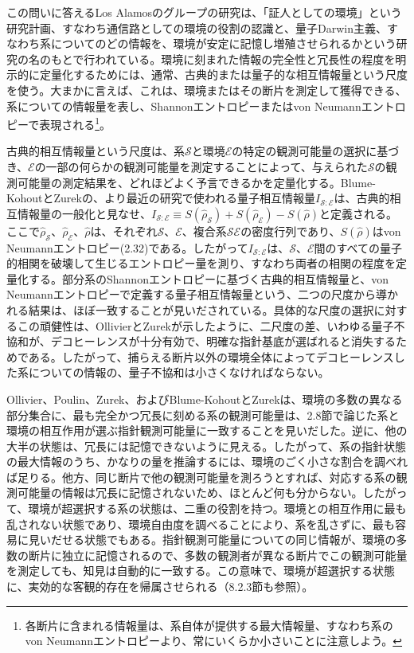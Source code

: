 この問いに答えるLos Alamosのグループの研究は、「証人としての環境」という研究計画、すなわち通信路としての環境の役割の認識と、量子Darwin主義、すなわち系についてのどの情報を、環境が安定に記憶し増殖させられるかという研究の名のもとで行われている\cite{ref066,ref110,ref111,ref112,ref113}。環境に刻まれた情報の完全性と冗長性の程度を明示的に定量化するためには、通常、古典的\cite{ref110,ref111}または量子的\cite{ref016,ref112,ref113}な相互情報量という尺度を使う。大まかに言えば、これは、環境またはその断片を測定して獲得できる、系についての情報量を表し、Shannonエントロピー\cite{ref114,ref115,ref116}またはvon Neumannエントロピーで表現される\footnote{各断片に含まれる情報量は、系自体が提供する最大情報量、すなわち系のvon Neumannエントロピーより、常にいくらか小さいことに注意しよう\cite{ref113}。}。

\hypertarget{srcpage:87}{}\label{srcpage:87}
古典的相互情報量という尺度は、系$\mathcal S$と環境$\mathcal E$の特定の観測可能量の選択に基づき、$\mathcal E$の一部の何らかの観測可能量を測定することによって、与えられた$\mathcal S$の観測可能量の測定結果を、どれほどよく予言できるかを定量化する\cite{ref110,ref111}。Blume-KohoutとZurekの、より最近の研究\cite{ref112,ref113}で使われる量子相互情報量$I_{\mathcal S:\mathcal E}$は、古典的相互情報量の一般化と見なせ、$I_{\mathcal S:\mathcal E}\equiv S(\hat\rho_{\mathcal S})+S(\hat\rho_{\mathcal E})-S(\hat\rho)$と定義される。ここで$\hat\rho_{\mathcal S}$、$\hat\rho_{\mathcal E}$、$\hat\rho$は、それぞれ$\mathcal S$、$\mathcal E$、複合系$\mathcal{SE}$の密度行列であり、$S(\hat\rho)$はvon Neumannエントロピー(2.32)である。したがって$I_{\mathcal S:\mathcal E}$は、$\mathcal S$、$\mathcal E$間のすべての量子的相関を破壊して生じるエントロピー量を測り、すなわち両者の相関の程度を定量化する。部分系のShannonエントロピーに基づく古典的相互情報量と、von Neumannエントロピーで定義する量子相互情報量という、二つの尺度から導かれる結果は、ほぼ一致することが見いだされている\cite{ref016,ref110,ref111,ref112,ref113}。具体的な尺度の選択に対するこの頑健性は、OllivierとZurek\cite{ref117}が示したように、二尺度の差、いわゆる量子不協和\cite{ref117}が、デコヒーレンスが十分有効で、明確な指針基底が選ばれると消失するためである。したがって、捕らえる断片以外の環境全体によってデコヒーレンスした系についての情報の、量子不協和は小さくなければならない。

Ollivier、Poulin、Zurek\cite{ref110,ref111}、およびBlume-KohoutとZurek\cite{ref112,ref113}は、環境の多数の異なる部分集合に、最も完全かつ冗長に刻める系の観測可能量は、2.8節で論じた系と環境の相互作用が選ぶ指針観測可能量に一致することを見いだした。逆に、他の大半の状態は、冗長には記憶できないように見える。したがって、系の指針状態の最大情報のうち、かなりの量を推論するには、環境のごく小さな割合を調べれば足りる。他方、同じ断片で他の観測可能量を測ろうとすれば、対応する系の観測可能量の情報は冗長に記憶されないため、ほとんど何も分からない。したがって、環境が超選択する系の状態は、二重の役割を持つ。環境との相互作用に最も乱されない状態であり、環境自由度を調べることにより、系を乱さずに、最も容易に見いだせる状態でもある。指針観測可能量についての同じ情報が、環境の多数の断片に独立に記憶されるので、多数の観測者が異なる断片でこの観測可能量を測定しても、知見は自動的に一致する。この意味で、環境が超選択する状態に、実効的な客観的存在を帰属させられる（8.2.3節も参照）。

